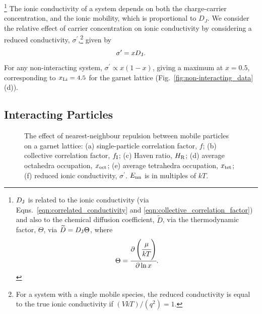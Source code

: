 \documentclass[aps,prb,twocolumn,superscriptaddress,reprint]{revtex4-1}
\newcommand{\xLi}{x_\m{Li}}
\begin{document}
\footnote{$D_{\mathrm{J}}$ is related to the ionic conductivity (via Eqns.~\ref{eqn:correlated_conductivity} and \ref{eqn:collective_correlation_factor}) and also to the chemical diffusion coefficient, ${\widetilde{D}}$, via the thermodynamic factor, $\Theta$, via ${\widetilde{D}}=D_{\mathrm{J}}\Theta$, where
\begin{equation}
  \Theta = \cfrac{\partial\left(\cfrac{\mu}{kT}\right)}{\partial \ln x}.
\end{equation}}
The ionic conductivity of a system depends on both the charge-carrier concentration, and the ionic mobility, which is proportional to $D_J$. We consider the relative effect of carrier concentration on ionic conductivity by
considering a reduced conductivity, $\sigma^\prime$,\footnote{For a system with a single mobile species, the reduced conductivity is equal to the true ionic conductivity if $(VkT)/(q^2)=1$.} given by
\begin{equation}
  \label{eqn:reduced_sigma}
  \sigma^\prime = xD_{\mathrm{J}}.
\end{equation}
For any non-interacting system, $\sigma^\prime\propto x\left(1-x\right)$, giving a maximum at $x=0.5$, corresponding to $\xLi=4.5$ for the garnet lattice (Fig.~\ref{fig:non-interacting_data}(d)).

\subsection{Interacting Particles}

\begin{figure}[tb]
  \centering
    \caption{\label{fig:nearest_neighbour_data}The effect of nearest-neighbour repulsion between mobile particles on a garnet lattice: (a) single-particle correlation factor, $f$; (b) collective correlation factor, $f_{\mathrm{I}}$; (c) Haven ratio, $H_{\mathrm{R}}$; (d) average octahedra occupation, $x_{\mathrm{oct}}$; (e) average tetrahedra occupation, $x_{\mathrm{tet}}$; (f) reduced ionic conductivity, $\sigma^\prime$. $E_{\mathrm{nn}}$ is in multiples of $kT$.}
\end{figure}
\end{document}
